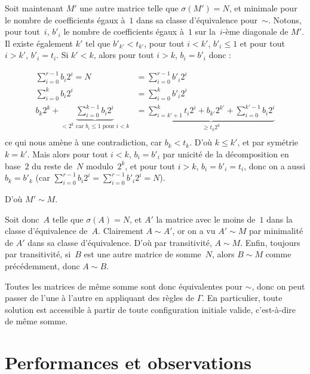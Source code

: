 \documentclass[11pt, openany, a4paper]{article}
\begin{document}
Soit maintenant $M'$ une autre matrice telle que $\sigma (M')=N$, et minimale pour le nombre de coefficients égaux à~$1$ dans sa classe d'équivalence pour~$\sim$. Notons, pour tout~$i$, $b'_i$ le nombre de coefficients égaux à~$1$ sur la~$i$-ème diagonale de $M'$. Il existe également $k'$ tel que $b'_{k'} < t_{k'}$, pour tout $i<k'$, $b'_i \leq 1$ et pour tout $i>k'$, $b'_i=t_i$. Si $k'<k$, alors pour tout $i>k$, $b_i= b'_i$ donc : 


\begin{align*}
\sum\limits_{i=0}^{r-1}b_i 2^i = N &= \sum\limits_{i=0}^{r-1}b'_i 2^i\\
\sum\limits_{i=0}^k b_i 2^i &= \sum\limits_{i=0}^k b'_i 2^i\\
b_k 2^k + \underbrace{\sum\limits_{i=0}^{k-1} b_i 2^i}_{\text{$< 2^k$ car $b_i \leq 1$ pour $i<k$}} &=\underbrace{\sum\limits_{i=k'+1}^k t_i 2^i + b_{k'} 2^{k'} + \sum\limits_{i=0}^{k' -1} b_i 2^i}_{\geq t_k 2^k}\\
\end{align*}
ce qui nous amène à une contradiction, car $b_k<t_k$. D'où $k \leq k'$, et par symétrie $k = k'$. Mais alors pour tout $i<k$, $b_i = b'_i$ par unicité de la décomposition en base~$2$ du reste de~$N$ modulo~$2^k$, et pour tout $i>k$, $b_i = b'_i = t_i$, donc on a aussi $b_k = b'_k$ (car $\sum\limits_{i=0}^{r-1} b_i 2^i = \sum\limits_{i=0}^{r-1} b'_i 2^i = N$).

D'où $M' \sim M$. 

Soit donc~$A$ telle que $\sigma(A)=N$, et $A'$ la matrice avec le moins de~$1$ dans la classe d'équi\-valence de~$A$. Clairement $A \sim A'$, or on a vu $A'\sim M$ par minimalité de $A'$ dans sa classe d'équivalence. D'où par transitivité, $A \sim M$. Enfin, toujours par transitivité, si~$B$ est une autre matrice de somme~$N$, alors $B \sim M$ comme précédemment, donc $A \sim B$.

Toutes les matrices de même somme sont donc équivalentes pour $\sim$, donc on peut passer de l'une à l'autre en appliquant des règles de $\Gamma$. En particulier, toute solution est accessible à partir de toute configuration initiale valide, c'est-à-dire de même somme. 



\section{Performances et observations}
\end{document}
